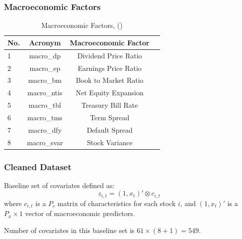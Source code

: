 \documentclass[aspectratio=169]{beamer}
\begin{document}
\begin{frame}
\frametitle{Macroeconomic Factors}
\begin{table}
	\caption{Macroeconomic Factors, (\cite{welch_comprehensive_2008})}
	\begin{center}
		\begin{tabular}{lccc} \hline
			No. & Acronym & Macroeconomic Factor \\ \hline
			1 & macro\_dp & Dividend Price Ratio \\
			2 & macro\_ep & Earnings Price Ratio \\
			3 & macro\_bm & Book to Market Ratio \\
			4 & macro\_ntis & Net Equity Expansion \\
			5 & macro\_tbl & Treasury Bill Rate \\
			6 & macro\_tms & Term Spread \\
			7 & macro\_dfy & Default Spread \\
			8 & macro\_svar & Stock Variance \\ \hline
		\end{tabular}
	\end{center}
\end{table}
\end{frame}

\begin{frame}
\frametitle{Cleaned Dataset}
Baseline set of covariates defined as:
\begin{equation}
	z_{i,t} = (1, x_t)' \otimes c_{i,t}
\end{equation}
where $c_{i,t}$ is a $P_c$ matrix of characteristics for each stock $i$, and $(1, x_t)'$ is a $P_x \times 1$ vector of macroeconomic predictors.

Number of covariates in this baseline set is $61 \times (8 + 1) = 549$. 
\end{frame}

\end{document}
